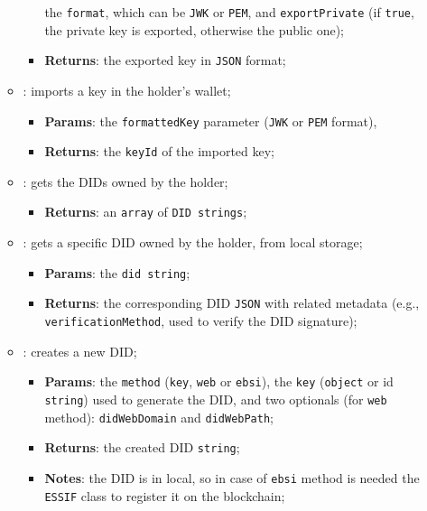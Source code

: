 \begin{itemize}
\begin{itemize}
\begin{itemize}
            the \texttt{format}, which can be \texttt{JWK} or \texttt{PEM}, and \texttt{exportPrivate}
            (if \texttt{true}, the private key is exported, otherwise the public one);
            \item \textbf{Returns}: the exported key in \texttt{JSON} format;
        \end{itemize}
        \item[] : imports a key in the holder's wallet;
        \begin{itemize}
            \item \textbf{Params}: the \texttt{formattedKey} parameter (\texttt{JWK} or \texttt{PEM} format),
            \item \textbf{Returns}: the \texttt{keyId} of the imported key;
        \end{itemize}
        \item[] : gets the DIDs owned by the holder;
        \begin{itemize}
            \item \textbf{Returns}: an \texttt{array} of \texttt{DID strings};
        \end{itemize}
        \item[] : gets a specific DID owned by the holder, from local storage;
        \begin{itemize}
            \item \textbf{Params}: the \texttt{did string};
            \item \textbf{Returns}: the corresponding DID \texttt{JSON} with related metadata
            (e.g., \texttt{verificationMethod}, used to verify the DID signature);
        \end{itemize}
        \item[] : creates a new DID;
        \begin{itemize}
            \item \textbf{Params}: the \texttt{method} (\texttt{key}, \texttt{web} or \texttt{ebsi}),
            the \texttt{key} (\texttt{object} or id \texttt{string}) used to generate the DID, and
            two optionals (for \texttt{web} method): \texttt{didWebDomain} and \texttt{didWebPath};
            \item \textbf{Returns}: the created DID \texttt{string};
            \item \textbf{Notes}: the DID is in local, so in case of \texttt{ebsi} method
            is needed the \texttt{ESSIF} class to register it on the blockchain;

\end{itemize}
\end{itemize}
\end{itemize}
